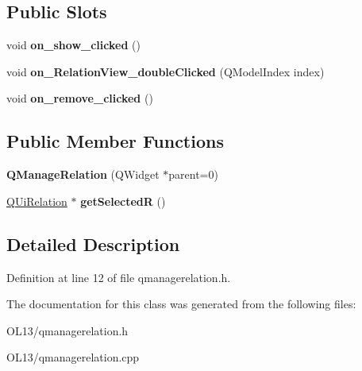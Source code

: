 \subsection*{Public Slots}
\begin{DoxyCompactItemize}
\item 
\mbox{\label{class_q_manage_relation_aef7e40af43fa29fb5d8b325718897883}} 
void {\bfseries on\+\_\+show\+\_\+clicked} ()
\item 
\mbox{\label{class_q_manage_relation_a45a9416aa18e0d6729ef5d0f9c37e626}} 
void {\bfseries on\+\_\+\+Relation\+View\+\_\+double\+Clicked} (Q\+Model\+Index index)
\item 
\mbox{\label{class_q_manage_relation_a94a9a99974177cde7677f5c6ede78722}} 
void {\bfseries on\+\_\+remove\+\_\+clicked} ()
\end{DoxyCompactItemize}
\subsection*{Public Member Functions}
\begin{DoxyCompactItemize}
\item 
\mbox{\label{class_q_manage_relation_af470c7a01389927cd834432d4d37f5c9}} 
{\bfseries Q\+Manage\+Relation} (Q\+Widget $\ast$parent=0)
\item 
\mbox{\label{class_q_manage_relation_a28ec1f2567446d681dd20bfcf3c53a41}} 
\hyperlink{class_q_ui_relation}{Q\+Ui\+Relation} $\ast$ {\bfseries get\+SelectedR} ()
\end{DoxyCompactItemize}


\subsection{Detailed Description}


Definition at line 12 of file qmanagerelation.\+h.



The documentation for this class was generated from the following files\+:\begin{DoxyCompactItemize}
\item 
O\+L13/qmanagerelation.\+h\item 
O\+L13/qmanagerelation.\+cpp\end{DoxyCompactItemize}
